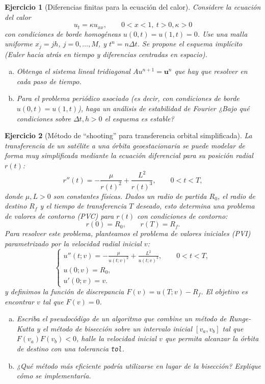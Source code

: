 \documentclass[12pt]{article}%
\newtheorem{exercise}{Ejercicio}
\begin{document}
\begin{exercise}[Diferencias finitas para la ecuación del calor]
Considere la ecuación del calor
\[
u_t= \kappa u_{xx}, \qquad 0<x<1,\ t>0,  \kappa>0
\]
con condiciones de borde homog\'eneas $u(0,t)=u(1,t)=0$. Use una malla uniforme $x_j=jh$, $j=0,\dots,M$, y $t^n=n\Delta t$. Se propone el esquema implícito (Euler hacia atrás en tiempo y diferencias centradas en espacio).
\begin{enumerate}[(a)]
\item Obtenga el sistema lineal tridiagonal $Au^{n+1}= \mathbf u^n$ que hay que resolver en cada paso de tiempo.
\item Para el problema peri\'odico asociado (es decir, con condiciones de borde $u(0,t)=u(1,t)$), haga un an\'alisis de estabilidad de Fourier ¿Bajo qué condiciones sobre $\Delta t,h>0$ el esquema es estable?
\end{enumerate}
\end{exercise}


\begin{exercise}[Método de ``shooting'' para transferencia orbital simplificada]
La transferencia de un satélite a una órbita geoestacionaria se puede modelar de forma muy simplificada mediante la ecuación diferencial para su posición radial $r(t)$:
\[
r''(t) = -\frac{\mu}{r(t)^2} + \frac{L^2}{r(t)^3}, \qquad 0 < t < T,
\]
donde $\mu, L > 0$ son constantes físicas. Dados un radio de partida $R_0$, el radio de destino $R_f$ y el tiempo de transferencia $T$ deseado, esto determina una problema de valores de contorno (PVC) para $r(t)$ con condiciones de contorno:
\[
r(0) = R_0, \qquad r(T) = R_f.
\]
Para resolver este problema, planteamos el problema de valores iniciales (PVI) parametrizado por la velocidad radial inicial $v$:
\[
\begin{cases}
u''(t; v) = -\frac{\mu}{u(t; v)^2} + \frac{L^2}{u(t; v)^3}, \qquad 0 < t < T, \\
u(0; v) = R_0, \\ u'(0; v) = v.
\end{cases}
\]
y definimos la función de discrepancia $F(v) = u(T; v) - R_f$. El objetivo es encontrar $v$ tal que $F(v) = 0$.

\begin{enumerate}[(a)]
\item Escriba el pseudocódigo de un algoritmo que combine un método de Runge-Kutta y el método de bisección sobre un intervalo inicial $[v_a, v_b]$ tal que $F(v_a)F(v_b) < 0$, halle la velocidad inicial $v$ que permita alcanzar la órbita de destino con una tolerancia \texttt{tol}. 
\item ¿Qué método más eficiente podría utilizarse en lugar de la bisección? Explique cómo se implementaría.
\end{enumerate}
\end{exercise}
\end{document}

